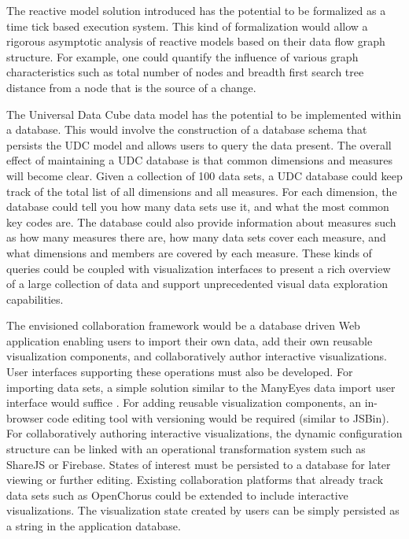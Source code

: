 The reactive model solution introduced has the potential to be formalized as a time tick based execution system. This kind of formalization would allow a rigorous asymptotic analysis of reactive models based on their data flow graph structure. For example, one could quantify the influence of various graph characteristics such as total number of nodes and breadth first search tree distance from a node that is the source of a change. 

The Universal Data Cube data model has the potential to be implemented within a database. This would involve the construction of a database schema that persists the UDC model and allows users to query the data present. The overall effect of maintaining a UDC database is that common dimensions and measures will become clear. Given a collection of 100 data sets, a UDC database could keep track of the total list of all dimensions and all measures. For each dimension, the database could tell you how many data sets use it, and what the most common key codes are. The database could also provide information about measures such as how many measures there are, how many data sets cover each measure, and what dimensions and members are covered by each measure. These kinds of queries could be coupled with visualization interfaces to present a rich overview of a large collection of data and support unprecedented visual data exploration capabilities.

The envisioned collaboration framework would be a database driven Web application enabling users to import their own data, add their own reusable visualization components, and collaboratively author interactive visualizations. User interfaces supporting these operations must also be developed. For importing data sets, a simple solution similar to the ManyEyes data import user interface would suffice \cite{viegas2007manyeyes}. For adding reusable visualization components, an in-browser code editing tool with versioning would be required (similar to JSBin). For collaboratively authoring interactive visualizations, the dynamic configuration structure can be linked with an operational transformation system such as ShareJS or Firebase. States of interest must be persisted to a database for later viewing or further editing. Existing collaboration platforms that already track data sets such as OpenChorus \cite{openChorus} could be extended to include interactive visualizations. The visualization state created by users can be simply persisted as a string in the application database.

